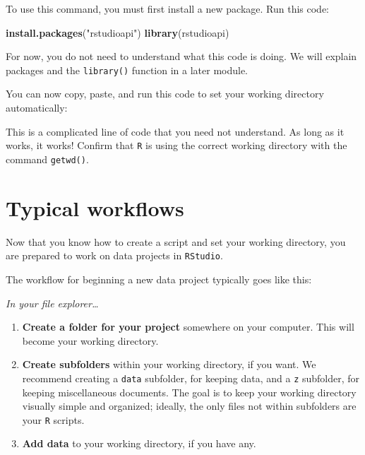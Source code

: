 \documentclass[
]{book}
\newenvironment{Shaded}{\begin{snugshade}}{\end{snugshade}}
\newcommand{\KeywordTok}[1]{\textcolor[rgb]{0.13,0.29,0.53}{\textbf{#1}}}
\newcommand{\NormalTok}[1]{#1}
\newcommand{\OperatorTok}[1]{\textcolor[rgb]{0.81,0.36,0.00}{\textbf{#1}}}
\newcommand{\StringTok}[1]{\textcolor[rgb]{0.31,0.60,0.02}{#1}}
\begin{document}
To use this command, you must first install a new package. Run this code:

\begin{Shaded}
\begin{Highlighting}[]
\KeywordTok{install.packages}\NormalTok{(}\StringTok{"rstudioapi"}\NormalTok{)}
\KeywordTok{library}\NormalTok{(rstudioapi)}
\end{Highlighting}
\end{Shaded}

For now, you do not need to understand what this code is doing. We will explain packages and the \texttt{library()} function in a later module.

You can now copy, paste, and run this code to set your working directory automatically:

\begin{Shaded}
\end{Shaded}

This is a complicated line of code that you need not understand. As long as it works, it works! Confirm that \texttt{R} is using the correct working directory with the command \texttt{getwd()}.

\hypertarget{typical-workflows}{%
\section*{Typical workflows}\label{typical-workflows}}

Now that you know how to create a script and set your working directory, you are prepared to work on data projects in \texttt{RStudio}.

The workflow for beginning a new data project typically goes like this:

\emph{In your file explorer\ldots{}}

\begin{enumerate}
\def\labelenumi{\arabic{enumi}.}
\item
  \textbf{Create a folder for your project} somewhere on your computer. This will become your working directory.
\item
  \textbf{Create subfolders} within your working directory, if you want. We recommend creating a \texttt{data} subfolder, for keeping data, and a \texttt{z} subfolder, for keeping miscellaneous documents. The goal is to keep your working directory visually simple and organized; ideally, the only files not within subfolders are your \texttt{R} scripts.
\item
  \textbf{Add data} to your working directory, if you have any.
\end{enumerate}
\end{document}
